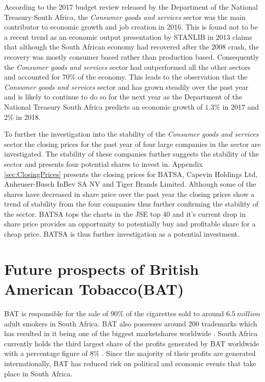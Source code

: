 \documentclass[letterpaper, 10 pt, conference]{ieeeconf}  %
\begin{document}
According to the 2017 budget review \cite{budgetReview} released by the Department of the National Treasury South Africa, the \textit{Consumer goods and services} sector was the main contributor to economic growth and job creation in 2016. This is found not to be a recent trend as an economic output presentation by STANLIB in 2013 \cite{stanlibReport} claims that although the South African economy had recovered after the 2008 crash, the recovery was mostly consumer based rather than production based. Consequently the \textit{Consumer goods and services} sector had outperformed all the other sectors and accounted for $70\%$ of the economy. This leads to the observation that the \textit{Consumer goods and services} sector and has grown steadily over the past year and is likely to continue to do so for the next year as the Department of the National Treasury South Africa predicts an economic growth of $1.3\%$ in 2017 and $2\%$ in 2018.

To further the investigation into the stability of the \textit{Consumer goods and services} sector the closing prices for the past year of four large companies in the sector are investigated. The stability of these companies further suggests the stability of the sector and presents four potential shares to invest in. Appendix \ref{sec:ClosingPrices} presents the closing prices for BATSA,  Capevin Holdings Ltd, Anheuser-Busch InBev SA NV and Tiger Brands Limited. Although some of the shares have decreased in share price over the past year the closing prices show a trend of stability from the four companies thus further confirming the stability of the sector. BATSA tops the charts in the JSE top 40 \cite{top40} and it's current drop in share price provides an opportunity to potentially buy and profitable share for a cheap price. BATSA is thus further investigation as a potential investment.
 

\section{Future prospects of British American Tobacco(BAT)}
BAT is responsible for the sale of $90\%$ of the cigarettes sold to around $6.5~million$ adult smokers in South Africa. BAT also possesses around 200 trademarks which has resulted in it being one of the biggest marketshares worldwide \cite{BAT_hist}. South Africa currently holds the third largest share of the profits generated by BAT worldwide with a percentage figure of $8\%$ \cite{BAT_hist}. Since the majority of their profits are generated internationally, BAT has reduced risk on political and economic events that take place in South Africa.
\end{document}
